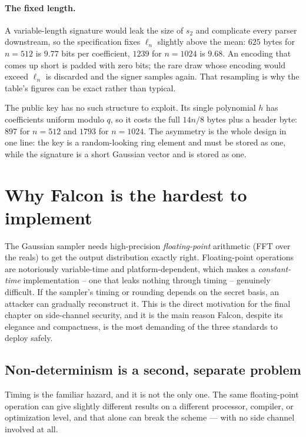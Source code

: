 \paragraph{The fixed length.} A variable-length signature would leak the size of $s_2$ and complicate every parser downstream, so the specification fixes $\ell_n$ slightly above the mean: $625$ bytes for $n=512$ is $9.77$ bits per coefficient, $1239$ for $n=1024$ is $9.68$. An encoding that comes up short is padded with zero bits; the rare draw whose encoding would exceed $\ell_n$ is discarded and the signer samples again. That resampling is why the table's figures can be exact rather than typical.

The public key has no such structure to exploit. Its single polynomial $h$ has coefficients uniform modulo $q$, so it costs the full $14n/8$ bytes plus a header byte: $897$ for $n=512$ and $1793$ for $n=1024$. The asymmetry is the whole design in one line: the key is a random-looking ring element and must be stored as one, while the signature is a short Gaussian vector and is stored as one.


\section{Why Falcon is the hardest to implement}
\label{sec:falcon-hard}

The Gaussian sampler needs high-precision \emph{floating-point} arithmetic (FFT over the reals) to get the output distribution exactly right. Floating-point operations are notoriously variable-time and platform-dependent, which makes a \emph{constant-time} implementation -- one that leaks nothing through timing -- genuinely difficult. If the sampler's timing or rounding depends on the secret basis, an attacker can gradually reconstruct it. This is the direct motivation for the final chapter on side-channel security, and it is the main reason Falcon, despite its elegance and compactness, is the most demanding of the three standards to deploy safely.

\subsection{Non-determinism is a second, separate problem}
\label{sec:falcon-determinism}

Timing is the familiar hazard, and it is not the only one. The same floating-point
operation can give slightly different results on a different processor, compiler,
or optimization level, and that alone can break the scheme --- with no side
channel involved at all.

